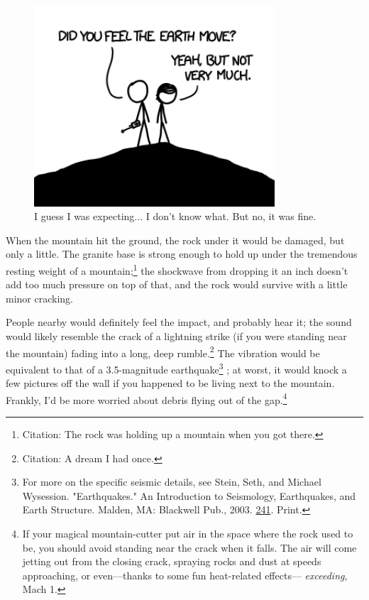 {\begin{figure}[!htbp]
\centering
\includegraphics[scale=0.5, max width=0.8\textwidth]{imgs/a/57/mountain_surf.png}
\caption{I guess I was expecting... I don't know what. But no, it was fine.}
\end{figure}

{When the mountain hit the ground, the rock under it would be damaged, but only a little. The granite base is strong enough to hold up under the tremendous resting weight of a mountain;{\footnote{Citation: The rock was holding up a mountain when you got there.} } the shockwave from dropping it an inch doesn't add too much pressure on top of that, and the rock would survive with a little minor cracking.}

{People nearby would definitely feel the impact, and probably hear it; the sound would likely resemble the crack of a lightning strike (if you were standing near the mountain) fading into a long, deep rumble.{\footnote{Citation: A dream I had once.} } The vibration would be equivalent to that of a 3.5-magnitude earthquake{\footnote{For more on the specific seismic details, see Stein, Seth, and Michael Wysession. "Earthquakes." An Introduction to Seismology, Earthquakes, and Earth Structure. Malden, MA: Blackwell Pub., 2003. \href{http://books.google.com/books?id=-z80yrwFsqoC&lpg=PA241&ots=nrVTZ77\_mJ&pg=PA241\#v=onepage&q&f=false}{241}. Print.} } ; at worst, it would knock a few pictures off the wall if you happened to be living next to the mountain. Frankly, I'd be more worried about debris flying out of the gap.{\footnote{If your magical mountain-cutter put air in the space where the rock used to be, you should avoid standing near the crack when it falls. The air will come jetting out from the closing crack, spraying rocks and dust at speeds approaching, or even—thanks to some fun heat-related effects— \emph{exceeding}, Mach 1.} } }

}
